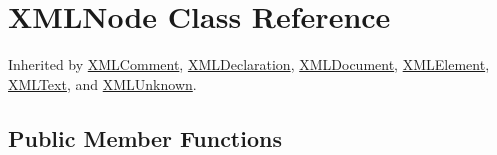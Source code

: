 \hypertarget{classtinyxml2_1_1_x_m_l_node}{\section{X\-M\-L\-Node Class Reference}
\label{classtinyxml2_1_1_x_m_l_node}
}


Inherited by \hyperlink{classtinyxml2_1_1_x_m_l_comment}{X\-M\-L\-Comment}, \hyperlink{classtinyxml2_1_1_x_m_l_declaration}{X\-M\-L\-Declaration}, \hyperlink{classtinyxml2_1_1_x_m_l_document}{X\-M\-L\-Document}, \hyperlink{classtinyxml2_1_1_x_m_l_element}{X\-M\-L\-Element}, \hyperlink{classtinyxml2_1_1_x_m_l_text}{X\-M\-L\-Text}, and \hyperlink{classtinyxml2_1_1_x_m_l_unknown}{X\-M\-L\-Unknown}.

\subsection*{Public Member Functions}
